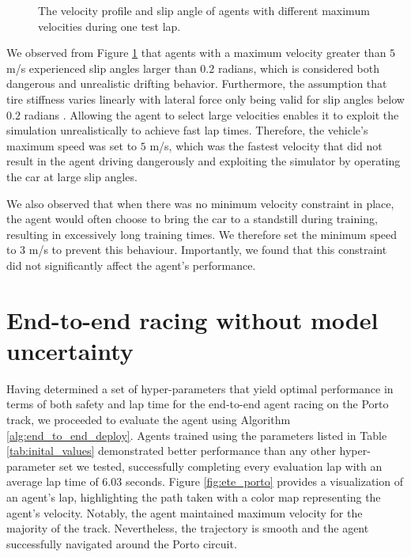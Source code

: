 \begin{figure}[htb!]
    \centering
    
    \caption{The velocity profile and slip angle of agents with different maximum velocities during one test lap.}
    \label{fig:vel_profile}
\end{figure}

We observed from Figure \ref{fig:vel_profile} that agents with a maximum velocity greater than $5$ m/s experienced slip angles larger than $0.2$ radians, which is considered both dangerous and unrealistic drifting behavior.
Furthermore, the assumption that tire stiffness varies linearly with lateral force only being valid for slip angles below $0.2$ radians \cite{Vorotovic2013}. 
Allowing the agent to select large velocities enables it to exploit the simulation unrealistically to achieve fast lap times.
Therefore, the vehicle's maximum speed was set to $5$ m/s, which was the fastest velocity that did not result in the agent driving dangerously and exploiting the simulator by operating the car at large slip angles.


We also observed that when there was no minimum velocity constraint in place, the agent would often choose to bring the car to a standstill during training, resulting in excessively long training times.
We therefore set the minimum speed to $3$ m/s to prevent this behaviour.
Importantly, we found that this constraint did not significantly affect the agent's performance.






\section{End-to-end racing without model uncertainty}

Having determined a set of hyper-parameters that yield optimal performance in terms of both safety and lap time for the end-to-end agent racing on the Porto track, we proceeded to evaluate the agent using Algorithm \ref{alg:end_to_end_deploy}.
Agents trained using the parameters listed in Table \ref{tab:inital_values} demonstrated better performance than any other hyper-parameter set we tested, successfully completing every evaluation lap with an average lap time of $6.03$ seconds. 
Figure \ref{fig:ete_porto} provides a visualization of an agent's lap, highlighting the path taken with a color map representing the agent's velocity. 
Notably, the agent maintained maximum velocity for the majority of the track.
Nevertheless, the trajectory is smooth and the agent successfully navigated around the Porto circuit.

